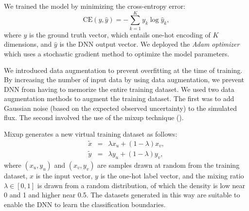 \documentclass[proof]{pasj01}
\providecommand{\DIFadd}[1]{{\protect\color{blue} \sf #1}} %
\providecommand{\DIFaddbegin}{\protect\color{blue}} %
\providecommand{\DIFaddend}{\protect\color{black}} %
\newcommand{\DIFaddincludegraphics}[2][]{{\color{blue}\fbox{\DIFOincludegraphics[#1]{#2}}}} %
\DeclareRobustCommand{\DIFaddbegin}{\DIFOaddbegin \let\includegraphics\DIFaddincludegraphics} %
\DeclareRobustCommand{\DIFaddend}{\DIFOaddend \let\includegraphics\DIFOincludegraphics} %
\begin{document}
We trained the model by minimizing the cross-entropy error: 
\begin{equation}
\mathrm{CE} \left(y, \hat{y} \right) =　-\sum_{k = 1}^K y_k \log \hat{y}_k,
\end{equation}
where $y$ is the ground truth vector, which entails one-hot encoding of $K$ dimensions, and $\hat{y}$ is the DNN output vector.
We deployed the {\it Adam optimizer} \citep{Kingma2014}\DIFaddbegin \DIFadd{, }\DIFaddend which uses a stochastic gradient method to optimize the model parameters.

We introduced data augmentation to prevent overfitting at the time of training.
By increasing the number of input data by using data augmentation, we prevent DNN from having to memorize the entire training dataset.
We used two data augmentation methods to augment the training dataset.
The first was to add Gaussian noise (based on the expected observed uncertainty) to the simulated flux.
The second involved the use of the mixup technique (\cite{mixup}).

Mixup generates a new virtual training dataset as follows:
\begin{eqnarray*}
    \tilde{x} &=& \lambda x_u + \left( 1-\lambda \right) x_v, \\
    \tilde{y} &=& \lambda y_u + \left( 1-\lambda \right) y_v,
\end{eqnarray*}
where $\left(x_u, y_u\right)$ and $\left(x_v, y_v\right)$ are samples drawn at random from the training dataset, $x$ is the input vector, $y$ is the one-hot label vector, 
and the mixing ratio $\lambda \in \left[0, 1\right]$ is drawn from a random distribution, of which the density is low near 0 and 1 and higher near 0.5. 
The datasets generated in this way are suitable to enable the DNN to learn the classification boundaries.
\end{document}
